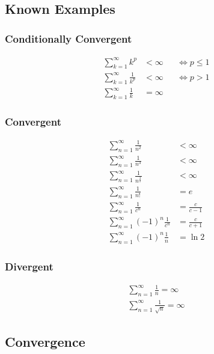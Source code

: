 \hypertarget{known-examples-1}{%
\subsection{Known Examples}\label{known-examples-1}}

\hypertarget{conditionally-convergent}{%
\subsubsection{Conditionally
Convergent}\label{conditionally-convergent}}

\begin{align*}
\sum_{k=1}^\infty k^p &< \infty 
&&\iff p \leq 1 \\
\sum_{k=1}^\infty \frac{1}{k^p} &< \infty 
&&\iff p > 1 \\
\sum_{k=1}^\infty \frac{1}{k} &= \infty 
&&
\end{align*}

\hypertarget{convergent}{%
\subsubsection{Convergent}\label{convergent}}

\begin{align*}
\sum_{n=1}^\infty \frac{1}{n^2}           & < \infty \\
\sum_{n=1}^\infty \frac{1}{n^3}           & < \infty \\
\sum_{n=1}^\infty \frac{1}{n^\frac{3}{2}} & < \infty \\
\sum_{n=1}^\infty \frac{1}{n!}            & = e \\
\sum_{n=1}^\infty \frac{1}{c^n}           & = \frac{c}{c-1} \\
\sum_{n=1}^\infty (-1)^n \frac{1}{c^n}    & = \frac{c}{c+1} \\
\sum_{n=1}^\infty (-1)^n \frac{1}{n}      & = \ln 2
\end{align*}

\hypertarget{divergent}{%
\subsubsection{Divergent}\label{divergent}}

\begin{align*}
\sum_{n=1}^\infty \frac{1}{n} = \infty \\
\sum_{n=1}^\infty \frac{1}{\sqrt n} = \infty 
\end{align*}

\hypertarget{convergence-1}{%
\subsection{Convergence}\label{convergence-1}}

